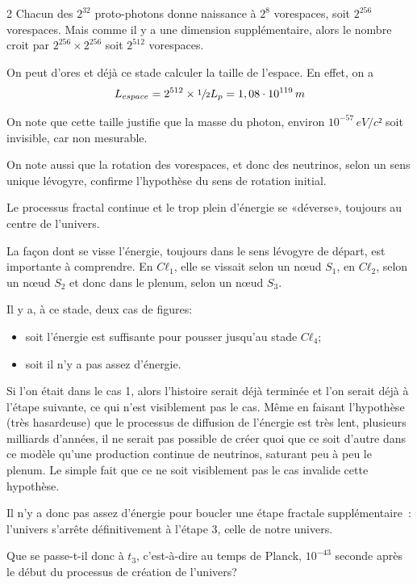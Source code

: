 \begin{multicols}{2}
Chacun des $2^{32}$ proto-photons donne naissance à $2^8$ vorespaces, soit
$2^{256}$ vorespaces. Mais comme il y a une dimension supplémentaire,
alors le nombre croit par $2^{256} \times 2^{256}$ soit $2^{512}$ vorespaces.

On peut d'ores et déjà ce stade calculer la taille de l'espace. En effet, on a
\begin{equation*}
L_{espace} = 2^{512} \times \sfrac{1}{2} L_p = 1,08 \cdot 10^{119}\,m
\end{equation*}

On note que cette taille justifie que la masse du photon, environ
$10^{-57}\,eV/c²$ soit invisible, car non mesurable.

On note aussi que la rotation des vorespaces, et donc des
neutrinos, selon un sens unique lévogyre, confirme l'hypothèse du sens
de rotation initial.

Le processus fractal continue et le trop plein d'énergie se
«déverse», toujours au centre de l'univers.

La façon dont se visse l'énergie, toujours dans le sens lévogyre de
départ, est importante à comprendre. En $Cℓ_1$, elle se vissait selon un nœud $S_1$,
en $Cℓ_2$, selon un nœud $S_2$ et donc dans le plenum, selon un nœud $S_3$.
\medskip

Il y a, à ce stade, deux cas de figures:

\begin{itemize}
	\item soit l'énergie est suffisante pour pousser jusqu'au stade $Cℓ_4$;
	\item soit il n'y a pas assez d'énergie.
\end{itemize}
 

Si l'on était dans le cas 1, alors l'histoire serait déjà terminée
et l'on serait déjà à l'étape suivante, ce qui n'est visiblement pas le
cas. Même en faisant l'hypothèse (très hasardeuse) que le processus de
diffusion de l'énergie est très lent, plusieurs milliards d'années, il
ne serait pas possible de créer quoi que ce soit  d'autre dans ce modèle
qu'une production continue de neutrinos, saturant peu à peu le plenum.
Le simple fait que ce ne soit visiblement pas le cas invalide cette
hypothèse.

Il n'y a donc pas assez d'énergie pour boucler une étape fractale
supplémentaire : l'univers s'arrête définitivement à l'étape 3, celle
de notre univers.

Que se passe-t-il donc à $t_3$, c'est-à-dire au temps de Planck, $10^{-43}$
seconde après le début du processus de création de l'univers?


\end{multicols}
